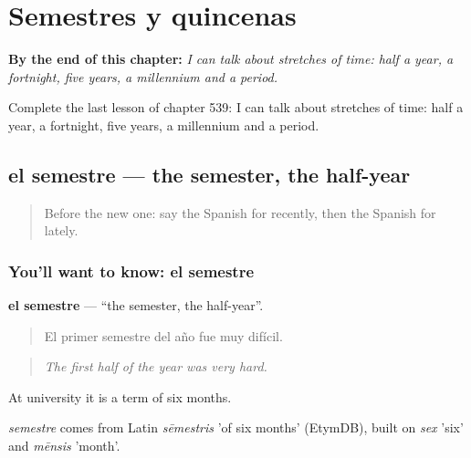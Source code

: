
\chapter{Semestres y quincenas}
\label{ch:es-semestres-y-quincenas}

\begin{chapteropening}
\textbf{By the end of this chapter:} \emph{I can talk about stretches of time: half a year, a fortnight, five years, a millennium and a period.}

Complete the last lesson of chapter 539: I can talk about stretches of time: half a year, a fortnight, five years, a millennium and a period.
\end{chapteropening}

\section[el semestre]{el semestre — the semester, the half-year}

\label{lesson:ES-C539-semestre}



\begin{quote}
Before the new one: say the Spanish for recently, then the Spanish for lately.
\end{quote}

\subsection*{You'll want to know: el semestre}
\textbf{el semestre} — \textquotedblleft{}the semester, the half-year\textquotedblright{}.

\begin{quote}
El primer semestre del año fue muy difícil.
\end{quote}

\begin{quote}
\emph{The first half of the year was very hard.}
\end{quote}

At university it is a term of six months.

\begin{cousinweb}
\emph{semestre} comes from Latin \emph{sēmestris} 'of six months' (EtymDB), built on \emph{sex} 'six' and \emph{mēnsis} 'month'.
\end{cousinweb}


